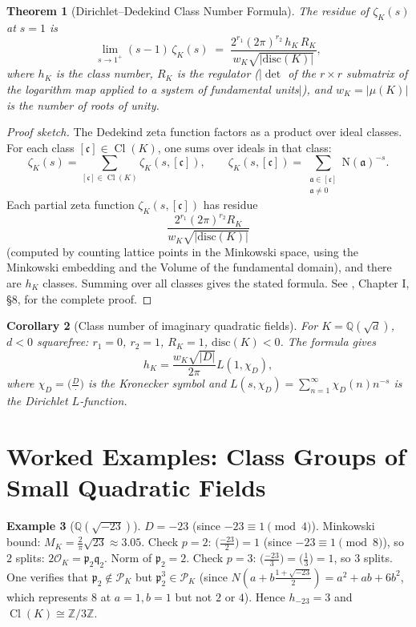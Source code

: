 \documentclass[12pt,a4paper]{amsart}
\newtheorem{theorem}{Theorem}[section]
\newtheorem{corollary}[theorem]{Corollary}
\theoremstyle{definition}
\newtheorem{example}[theorem]{Example}
\newcommand{\Z}{\mathbb{Z}}
\newcommand{\Q}{\mathbb{Q}}
\newcommand{\OK}{\mathcal{O}_K}
\newcommand{\p}{\mathfrak{p}}
\newcommand{\q}{\mathfrak{q}}
\newcommand{\aaa}{\mathfrak{a}}
\newcommand{\Nm}{\mathrm{N}}
\newcommand{\disc}{\mathrm{disc}}
\DeclareMathOperator{\Cl}{Cl}
\begin{document}
\begin{theorem}[Dirichlet--Dedekind Class Number Formula]
\label{thm:class_number_formula}
The residue of $\zeta_K(s)$ at $s = 1$ is
\[
  \lim_{s \to 1^+} (s-1)\,\zeta_K(s)
  \;=\;
  \frac{2^{r_1} (2\pi)^{r_2}\, h_K\, R_K}{w_K \sqrt{|\disc(K)|}},
\]
where $h_K$ is the class number, $R_K$ is the \emph{regulator}
($|\det$ of the $r \times r$ submatrix of the logarithm map applied to a
system of fundamental units$|$), and $w_K = |\mu(K)|$ is the number of roots
of unity.
\end{theorem}

\begin{proof}[Proof sketch]
The Dedekind zeta function factors as a product over ideal classes.
For each class $[\mathfrak{c}] \in \Cl(K)$, one sums over ideals in that class:
\[
  \zeta_K(s) = \sum_{[\mathfrak{c}] \in \Cl(K)} \zeta_K(s, [\mathfrak{c}]),
  \qquad
  \zeta_K(s, [\mathfrak{c}]) = \sum_{\substack{\aaa \in [\mathfrak{c}] \\ \aaa \ne 0}}
  \Nm(\aaa)^{-s}.
\]
Each partial zeta function $\zeta_K(s,[\mathfrak{c}])$ has residue
\[
  \frac{2^{r_1}(2\pi)^{r_2} R_K}{w_K \sqrt{|\disc(K)|}}
\]
(computed by counting lattice points in the Minkowski space, using the
Minkowski embedding and the Volume of the fundamental domain), and there
are $h_K$ classes.  Summing over all classes gives the stated formula.
See \cite{Neukirch1999}, Chapter I, \S8, for the complete proof.
\end{proof}

\begin{corollary}[Class number of imaginary quadratic fields]
For $K = \Q(\sqrt{d})$, $d < 0$ squarefree: $r_1 = 0$, $r_2 = 1$, $R_K = 1$,
$\disc(K) < 0$.  The formula gives
\[
  h_K = \frac{w_K \sqrt{|D|}}{2\pi} L(1, \chi_D),
\]
where $\chi_D = \bigl(\tfrac{D}{\cdot}\bigr)$ is the Kronecker symbol and
$L(s, \chi_D) = \sum_{n=1}^\infty \chi_D(n) n^{-s}$ is the Dirichlet $L$-function.
\end{corollary}

\section{Worked Examples: Class Groups of Small Quadratic Fields}

\begin{example}[$\Q(\sqrt{-23})$]
$D = -23$ (since $-23 \equiv 1 \pmod{4}$).  Minkowski bound:
$M_K = \frac{2}{\pi}\sqrt{23} \approx 3.05$.
Check $p = 2$: $\bigl(\tfrac{-23}{2}\bigr) = 1$ (since $-23 \equiv 1 \pmod 8$),
so $2$ splits: $2\OK = \p_2 \q_2$.  Norm of $\p_2 = 2$.
Check $p = 3$: $\bigl(\tfrac{-23}{3}\bigr) = \bigl(\tfrac{1}{3}\bigr) = 1$,
so $3$ splits.
One verifies that $\p_2 \notin \mathcal{P}_K$ but $\p_2^3 \in \mathcal{P}_K$
(since $N(a + b\tfrac{1+\sqrt{-23}}{2}) = a^2 + ab + 6b^2$, which represents
$8$ at $a=1, b=1$ but not $2$ or $4$).
Hence $h_{-23} = 3$ and $\Cl(K) \cong \Z/3\Z$.
\end{example}
\end{document}
